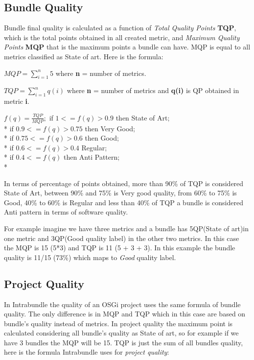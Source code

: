 \subsection{Bundle Quality}
Bundle final quality is calculated as a function of \emph{Total Quality Points} \textbf{TQP}, which is the total points obtained in all created metric, and \emph{Maximum Quality Points} \textbf{MQP} that is the maximum points a bundle can have. MQP is equal to all metrics classified as State of art. Here is the formula:\newline    

\(MQP = \sum_{i=1}^{n} 5 \) where \textbf{n} = number of metrics. \newline

\(TQP = \sum_{i=1}^{n} q(i) \) where \textbf{n} = number of metrics and \textbf{q(i)} is QP obtained in metric \textbf{i}. \newline

 
\(
f(q) = \frac{TQP}{MQP};
\)
\newline
\newline
 if \( 1 <= f(q) > 0.9 \) then State of Art; \\*
 if \( 0.9 <= f(q) > 0.75 \) then Very Good; \\*
 if \( 0.75 <= f(q) > 0.6 \) then Good; \\*
 if \( 0.6 <= f(q) > 0.4 \) Regular; \\*
 if \( 0.4 <= f(q) \) then Anti Pattern;\\*

In terms of percentage of points obtained, more than 90\% of TQP is considered State of Art, between 90\% and 75\% is Very good quality, from 60\% to 75\% is Good, 40\% to 60\% is Regular and less than 40\% of TQP a bundle is considered Anti pattern in terms of software quality. 

For example imagine we have three metrics and a bundle has 5QP(State of art)in one metric and 3QP(Good quality label) in the other two metrics. In this case the MQP is 15 (5*3) and TQP is 11 (5 + 3 + 3). In this example the bundle quality is 11/15 (73\%) which maps to \emph{Good} quality label. 


\subsection{Project Quality}
\label{sec:project-quality}
In Intrabundle the quality of an OSGi project uses the same formula of bundle quality. The only difference is in MQP and TQP which in this case are based on bundle's quality instead of metrics. In project quality the maximum point is calculated considering all bundle's quality as State of art, so for example if we have 3 bundles the MQP will be 15. TQP is just the sum of all bundles quality, here is the formula Intrabundle uses for \emph{project quality}:

